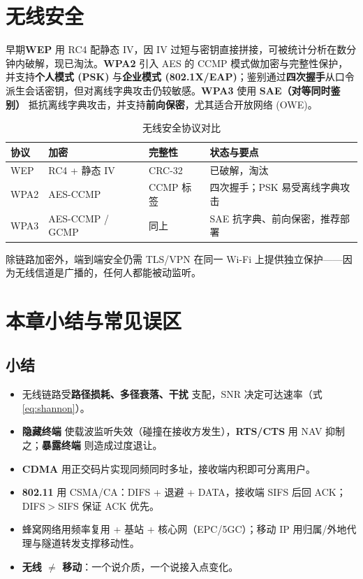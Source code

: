 \section{无线安全}

早期\textbf{WEP} 用 RC4 配静态 IV，因 IV 过短与密钥直接拼接，可被统计分析在数分钟内破解，现已淘汰。\textbf{WPA2} 引入 AES 的 CCMP 模式做加密与完整性保护，并支持\textbf{个人模式 (PSK)} 与\textbf{企业模式 (802.1X/EAP)}；鉴别通过\textbf{四次握手}从口令派生会话密钥，但对离线字典攻击仍较敏感。\textbf{WPA3} 使用 \textbf{SAE（对等同时鉴别）} 抵抗离线字典攻击，并支持\textbf{前向保密}，尤其适合开放网络 (OWE)。

\begin{table}[H]
\centering
\caption{无线安全协议对比}
\renewcommand{\arraystretch}{1.35}
\begin{tabulary}{\textwidth}{@{}lLLL@{}}
\toprule
\textbf{协议} & \textbf{加密} & \textbf{完整性} & \textbf{状态与要点} \\
\midrule
WEP   & RC4 + 静态 IV & CRC-32 & 已破解，淘汰 \\
WPA2  & AES-CCMP & CCMP 标签 & 四次握手；PSK 易受离线字典攻击 \\
WPA3  & AES-CCMP / GCMP & 同上 & SAE 抗字典、前向保密，推荐部署 \\
\bottomrule
\end{tabulary}
\end{table}

除链路加密外，端到端安全仍需 TLS/VPN 在同一 Wi-Fi 上提供独立保护——因为无线信道是广播的，任何人都能被动监听。

\section{本章小结与常见误区}

\subsection{小结}

\begin{itemize}
    \item 无线链路受\textbf{路径损耗、多径衰落、干扰} 支配，SNR 决定可达速率（式 \eqref{eq:shannon}）。
    \item \textbf{隐藏终端} 使载波监听失效（碰撞在接收方发生），\textbf{RTS/CTS} 用 NAV 抑制之；\textbf{暴露终端} 则造成过度退让。
    \item \textbf{CDMA} 用正交码片实现同频同时多址，接收端内积即可分离用户。
    \item \textbf{802.11} 用 CSMA/CA：DIFS + 退避 + DATA，接收端 SIFS 后回 ACK；DIFS$>$SIFS 保证 ACK 优先。
    \item 蜂窝网络用频率复用 + 基站 + 核心网（EPC/5GC）；移动 IP 用归属/外地代理与隧道转发支撑移动性。
    \item \textbf{无线 $\neq$ 移动}：一个说介质，一个说接入点变化。
\end{itemize}

